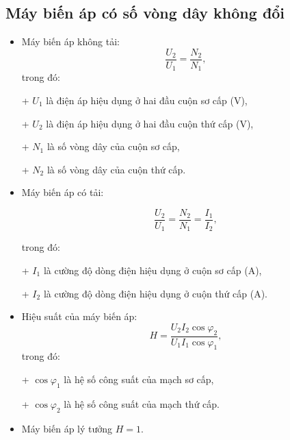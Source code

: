 \subsection{Máy biến áp có số vòng dây không đổi}
\begin{itemize}
	\item Máy biến áp không tải:
	\begin{equation*}
		\dfrac{U_2}{U_1}=\dfrac{N_2}{N_1},
	\end{equation*}
	trong đó:
	
	+ $U_1$ là điện áp hiệu dụng ở hai đầu cuộn sơ cấp (V),
	
	+ $U_2$ là điện áp hiệu dụng ở hai đầu cuộn thứ cấp (V), 
	
	+ $N_1$ là số vòng dây của cuộn sơ cấp,
	
	+ $N_2$ là số vòng dây của cuộn thứ cấp.
	
	\item Máy biến áp có tải:
	
	\begin{equation*}
		\dfrac{U_2}{U_1}=\dfrac{N_2}{N_1}=\dfrac{I_1}{I_2},
	\end{equation*}
	
	trong đó:
	
	+ $I_1$ là cường độ dòng điện hiệu dụng ở cuộn sơ cấp (A), 
	
	+ $I_2$ là cường độ dòng điện hiệu dụng ở cuộn thứ cấp (A).
	
	\item Hiệu suất của máy biến áp:
	\begin{equation*}
		H=\dfrac{U_2 I_2 \cos \varphi_2}{U_1I_1 \cos \varphi_1}, 
	\end{equation*}
	trong đó:
	
	+ $\cos \varphi_1$ là hệ số công suất của mạch sơ cấp,
	
	+ $\cos \varphi_2$ là hệ số công suất của mạch thứ cấp.
	
	\item Máy biến áp lý tưởng $H=1$.
	
\end{itemize}
